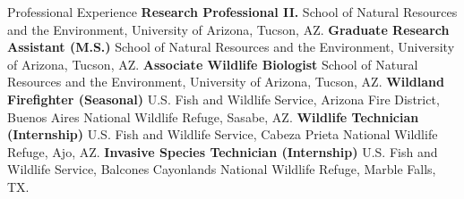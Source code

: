 \begin{rubric}{Professional Experience}
\entry*[8/2018 -- Present]%
	\textbf{Research Professional II.} School of Natural Resources and the Environment, University of Arizona, Tucson, AZ.
%
\entry*[7/2016 -- 5/2018]%
	\textbf{Graduate Research Assistant (M.S.)} School of Natural Resources and the Environment, University of Arizona, Tucson, AZ.
%
\entry*[3/2016 -- 7/2016]%
    \textbf{Associate Wildlife Biologist} School of Natural Resources and the Environment, University of Arizona, Tucson, AZ.
%
\entry*[4/2015 -- 10/2015]%
    \textbf{Wildland Firefighter (Seasonal)} U.S. Fish and Wildlife Service, Arizona Fire District, Buenos Aires National Wildlife Refuge, Sasabe, AZ.
%
\entry*[9/2013 -- 5/2015]
    \textbf{Wildlife Technician (Internship)} U.S. Fish and Wildlife Service, Cabeza Prieta National Wildlife Refuge, Ajo, AZ.
%
\entry*[5/2013 -- 9/2013]
    \textbf{Invasive Species Technician (Internship)} U.S. Fish and Wildlife Service, Balcones Cayonlands National Wildlife Refuge, Marble Falls, TX.
\end{rubric}